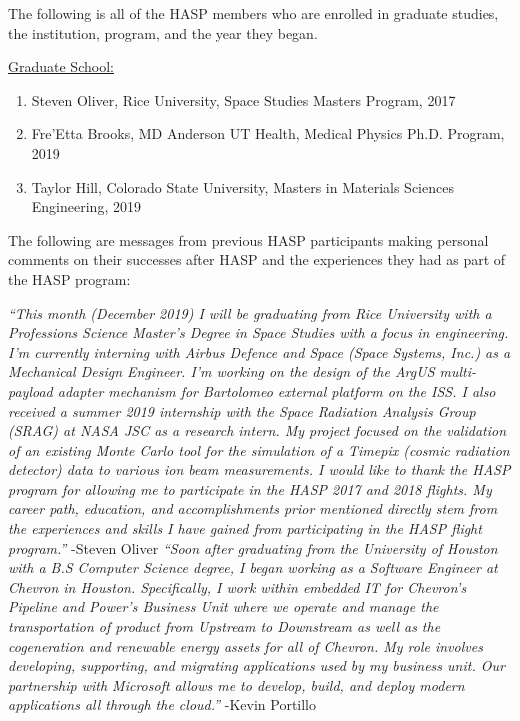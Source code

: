 \begin{appendices}
  \vspace{0.5cm}
  
  \noindent The following is all of the HASP members who are enrolled in graduate studies, the institution, program, and the year they began.
  
  \vspace{0.25cm}
  \noindent\underline{Graduate School:}
  \begin{enumerate}[leftmargin=3\parindent]
  \item Steven Oliver, Rice University, Space Studies Masters Program, 2017
  \item Fre'Etta Brooks, MD Anderson UT Health, Medical Physics Ph.D. Program, 2019
  \item Taylor Hill, Colorado State University, Masters in Materials Sciences Engineering, 2019
  \end{enumerate}

  The following are messages from previous HASP participants making personal comments on their successes after HASP and the experiences they had as part of the HASP program:

  \textit{``This month (December 2019) I will be graduating from Rice University with a Professions Science Master's Degree in Space Studies with a focus in engineering. I'm currently interning with Airbus Defence and Space (Space Systems, Inc.) as a Mechanical Design Engineer. I'm working on the design of the ArgUS multi-payload adapter mechanism for Bartolomeo external platform on the ISS. \newline
    I also received a summer 2019 internship with the Space Radiation Analysis Group (SRAG) at NASA JSC as a research intern. My project focused on the validation of an existing Monte Carlo tool for the simulation of a Timepix (cosmic radiation detector) data to various ion beam measurements. \newline
    I would like to thank the HASP program for allowing me to participate in the HASP 2017 and 2018 flights. My career path, education, and accomplishments prior mentioned directly stem from the experiences and skills I have gained from participating in the HASP flight program.''}
  \newline\hspace*{12cm} -Steven Oliver
  \vspace{2cm}
  \textit{``Soon after graduating from the University of Houston with a B.S Computer Science degree, I began working as a Software Engineer at Chevron in Houston. Specifically, I work within embedded IT for Chevron’s Pipeline and Power’s Business Unit where we operate and manage the transportation of product from Upstream to Downstream as well as the cogeneration and renewable energy assets for all of Chevron. My role involves developing, supporting, and migrating applications used by my business unit. Our partnership with Microsoft allows me to develop, build, and deploy modern applications all through the cloud.''}
  \newline\hspace*{12cm} -Kevin Portillo

  
\end{appendices}
